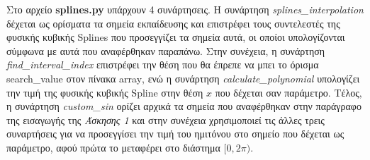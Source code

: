 \documentclass[Second Project.tex]{subfiles}
\begin{document}
\vspace{10mm}
Στο αρχείο \textlatin{\textbf{splines.py}} υπάρχουν 4 συνάρτησεις. Η συνάρτηση 
\textlatin{\textit{splines\_interpolation}} δέχεται ως ορίσματα τα σημεία εκπαίδευσης και επιστρέφει τους συντελεστές της φυσικής κυβικής 
\textlatin{Splines} που προσεγγίζει τα σημεία αυτά, οι οποίοι υπολογίζονται σύμφωνα με αυτά που αναφέρθηκαν παραπάνω. Στην συνέχεια, η 
συνάρτηση \textlatin{\textit{find\_interval\_index}} επιστρέφει την θέση που θα έπρεπε να μπει το όρισμα \textlatin{search\_value} στον πίνακα
\textlatin{array}, ενώ η συνάρτηση \textlatin{\textit{calculate\_polynomial}} υπολογίζει την τιμή της φυσικής κυβικής \textlatin{Spline} στην 
θέση $x$ που δέχεται σαν παράμετρο. Τέλος, η συνάρτηση \textlatin{\textit{custom\_sin}} ορίζει αρχικά τα σημεία που αναφέρθηκαν στην παράγραφο
της εισαγωγής της \textit{Άσκησης 1} και στην συνέχεια χρησιμοποιεί τις άλλες τρεις συναρτήσεις για να προσεγγίσει την τιμή του ημιτόνου στο 
σημείο που δέχεται ως παράμετρο, αφού πρώτα το μεταφέρει στο διάστημα $[0,2\pi)$. 
\newpage
\end{document}
